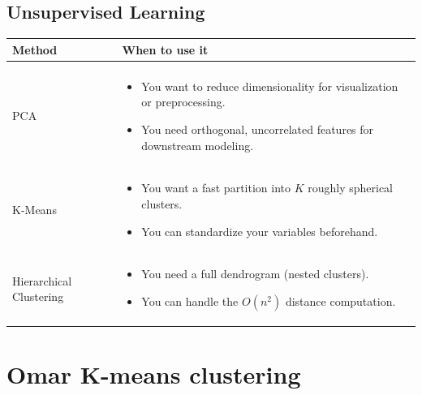 \documentclass{article}
\begin{document}
\bigskip
\subsection{Unsupervised Learning}

\begin{tabular}{p{4cm} p{11cm}}
\textbf{Method} & \textbf{When to use it} \\[6pt]
\hline \\[-6pt]
PCA &
\begin{itemize}[nosep]
  \item You want to reduce dimensionality for visualization or preprocessing.
  \item You need orthogonal, uncorrelated features for downstream modeling.
\end{itemize}
\\[8pt]
K-Means &
\begin{itemize}[nosep]
  \item You want a fast partition into \(K\) roughly spherical clusters.
  \item You can standardize your variables beforehand.
\end{itemize}
\\[8pt]
Hierarchical Clustering &
\begin{itemize}[nosep]
  \item You need a full dendrogram (nested clusters).
  \item You can handle the \(O(n^2)\) distance computation.
\end{itemize}
\end{tabular}

\pagebreak

\section{Omar K-means clustering}
\end{document}
